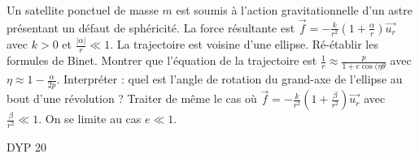 \begin{Exercise}[title=Pertubation d'une force centrale]

  Un satellite ponctuel de masse $m$ est soumis à l'action gravitationnelle d'un astre présentant un défaut de sphéricité. La force résultante est $\vec{f}=-\frac{k}{r^2}(1+\frac{\alpha}{r})\vec{u_r}$ avec $k>0$ et $\frac{|\alpha|}{r} \ll 1$. La trajectoire est voisine d'une ellipse.
    \Question Ré-établir les formules de Binet.
    \Question Montrer que l'équation de la trajectoire est $\frac{1}{r} \approx \frac{p}{1+e \cos(\eta \theta}$ avec $\eta \approx 1 - \frac{\alpha}{2p}$.
    \Question Interpréter : quel est l'angle de rotation du grand-axe de l'ellipse au bout d'une révolution ?
    \Question Traiter de même le cas où $\vec{f}=-\frac{k}{r^2}(1+\frac{\beta}{r^2})\vec{u_r}$ avec $\frac{\beta}{r^2} \ll 1$. On se limite au cas $e \ll 1$.
\end{Exercise}
\begin{Answer}
  DYP 20
\end{Answer}
